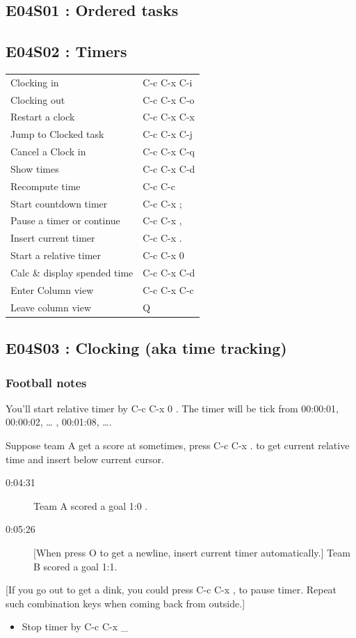 \documentclass[11pt]{article}
\begin{document}
\subsection{E04S01 : Ordered tasks}
\label{sec:org2520a2b}
\subsection{E04S02 : Timers}
\label{sec:org72cf509}
\begin{center}
\begin{tabular}{ll}
\hline
Clocking in &  C-c C-x C-i \\
Clocking out &  C-c C-x C-o \\
Restart a clock &  C-c C-x C-x \\
Jump to Clocked task &  C-c C-x C-j \\
Cancel a Clock in &  C-c C-x C-q \\
Show times &  C-c C-x C-d \\
Recompute time &  C-c C-c \\
Start countdown timer &  C-c C-x ; \\
Pause a timer or continue &  C-c C-x , \\
Insert current timer &  C-c C-x . \\
Start a relative timer &  C-c C-x 0 \\
Calc \& display spended time &  C-c C-x C-d \\
Enter Column view &  C-c C-x C-c \\
Leave column view &  Q \\
\hline
\end{tabular}
\end{center}

\subsection{E04S03 : Clocking (aka time tracking)}
\label{sec:orge9b1135}
\subsubsection{Football notes}
\label{sec:orgd87d05d}

You'll start relative timer by  C-c C-x 0 
. The timer will be tick from 00:00:01, 00:00:02, \ldots{} , 00:01:08, \ldots{}.

Suppose team A get a score at sometimes, press  C-c C-x .
 to get current relative time and insert below current
cursor.

\begin{description}
\item[{0:04:31}] Team A scored a goal 1:0 .
\item[{0:05:26}] [When press  O  to get a
newline, insert current timer automatically.] Team B scored
a goal 1:1.
\end{description}
[If you go out to get a dink, you could press  C-c C-x ,  
 to pause timer. Repeat such combination keys when coming back from outside.]
\begin{itemize}
\item Stop timer by  C-c C-x \_
\end{itemize}
\end{document}
